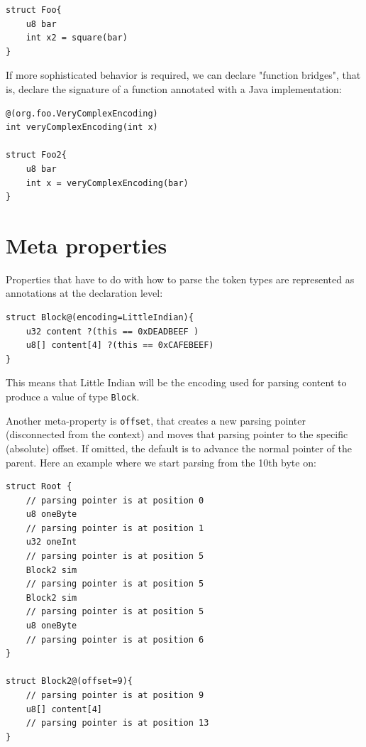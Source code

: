 \documentclass[10pt,oneside]{article}
\begin{document}
\begin{verbatim}
struct Foo{
    u8 bar
    int x2 = square(bar)
}
\end{verbatim}

If more sophisticated behavior is required, we can declare "function
bridges", that is, declare the signature of a function annotated with a
Java implementation:

\begin{verbatim}
@(org.foo.VeryComplexEncoding)
int veryComplexEncoding(int x)

struct Foo2{
    u8 bar
    int x = veryComplexEncoding(bar)
}
\end{verbatim}

\hypertarget{meta-properties}{%
\section{Meta properties}\label{meta-properties}}

Properties that have to do with how to parse the token types are
represented as annotations at the declaration level:

\begin{verbatim}
struct Block@(encoding=LittleIndian){
    u32 content ?(this == 0xDEADBEEF )
    u8[] content[4] ?(this == 0xCAFEBEEF)
}
\end{verbatim}

This means that Little Indian will be the encoding used for parsing
content to produce a value of type \texttt{Block}.

Another meta-property is \texttt{offset}, that creates a new parsing
pointer (disconnected from the context) and moves that parsing pointer
to the specific (absolute) offset. If omitted, the default is to advance
the normal pointer of the parent. Here an example where we start parsing
from the 10th byte on:

\begin{verbatim}
struct Root {
    // parsing pointer is at position 0
    u8 oneByte
    // parsing pointer is at position 1
    u32 oneInt
    // parsing pointer is at position 5
    Block2 sim
    // parsing pointer is at position 5
    Block2 sim
    // parsing pointer is at position 5
    u8 oneByte
    // parsing pointer is at position 6
}

struct Block2@(offset=9){
    // parsing pointer is at position 9
    u8[] content[4]
    // parsing pointer is at position 13
}
\end{verbatim}
\end{document}
